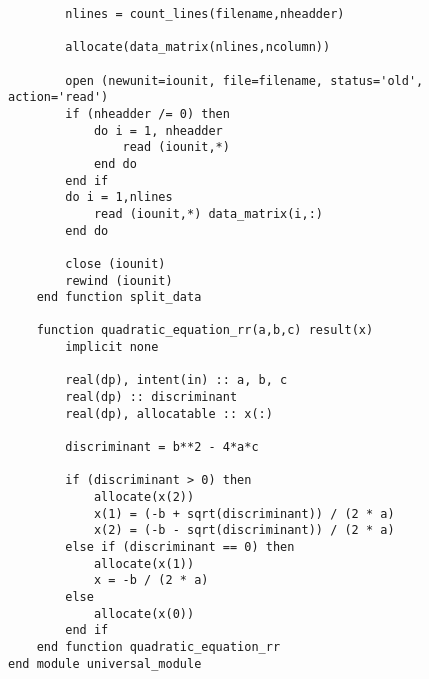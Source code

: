 \begin{verbatim}
        nlines = count_lines(filename,nheadder)

        allocate(data_matrix(nlines,ncolumn))

        open (newunit=iounit, file=filename, status='old', action='read')
        if (nheadder /= 0) then
            do i = 1, nheadder
                read (iounit,*)
            end do
        end if
        do i = 1,nlines
            read (iounit,*) data_matrix(i,:)
        end do

        close (iounit)
        rewind (iounit)
    end function split_data

    function quadratic_equation_rr(a,b,c) result(x)
        implicit none

        real(dp), intent(in) :: a, b, c
        real(dp) :: discriminant
        real(dp), allocatable :: x(:)

        discriminant = b**2 - 4*a*c

        if (discriminant > 0) then
            allocate(x(2))
            x(1) = (-b + sqrt(discriminant)) / (2 * a)
            x(2) = (-b - sqrt(discriminant)) / (2 * a)
        else if (discriminant == 0) then
            allocate(x(1))
            x = -b / (2 * a)
        else
            allocate(x(0))
        end if
    end function quadratic_equation_rr
end module universal_module
\end{verbatim}